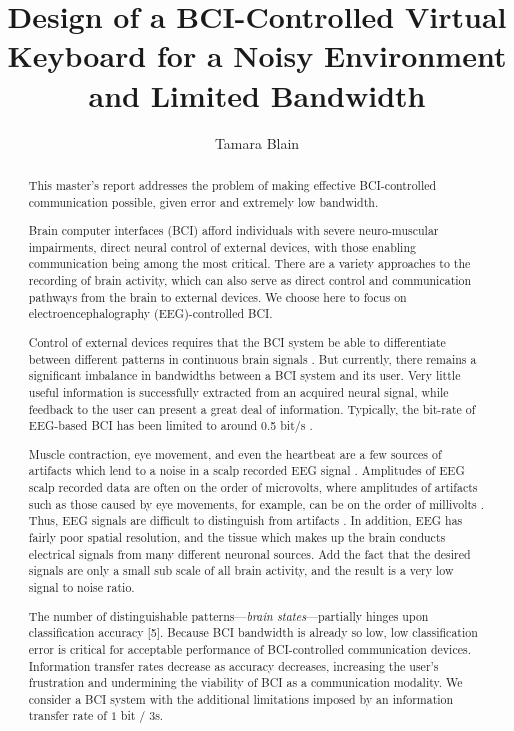 \documentclass[12pt,titlepage]{article}
\begin{document}
\title{Design of a BCI-Controlled Virtual Keyboard for a Noisy Environment and Limited Bandwidth} %
\author{Tamara Blain}
\maketitle

\begin{abstract}
This master's report addresses the problem of making effective BCI-controlled communication possible, given error and extremely low bandwidth.

Brain computer interfaces (BCI) afford individuals with severe neuro-muscular impairments, direct neural control of external devices, with those enabling communication being among the most critical.  There are a variety approaches to the recording of brain activity, which can also serve as direct control and communication pathways from the brain to external devices.  We choose here to focus on electroencephalography (EEG)-controlled BCI.

Control of external devices requires that the BCI system be able to differentiate between different patterns in continuous brain signals \cite{lotte_review_2007}.  But currently, there remains a significant imbalance in bandwidths between a BCI system and its user.  Very little useful information is successfully extracted from an acquired neural signal, while feedback to the user can present a 
great deal of information.  Typically, the bit-rate of EEG-based BCI has been limited to around 0.5 bit/s \cite{millan2004}.

Muscle contraction, eye movement, and even the heartbeat are a few sources of artifacts which lend to a noise in a scalp recorded EEG signal \cite{nunez_electric_2005}.  Amplitudes of EEG scalp recorded data are often on the order of microvolts, where amplitudes of artifacts such as those caused by eye movements, for example, can be on the order of millivolts \cite{tatum2007handbook}.  Thus, EEG signals are difficult to distinguish from artifacts \cite{nunez_electric_2005}.  In addition, EEG has fairly poor spatial resolution, and the tissue which makes up the brain conducts electrical signals from many 
different neuronal sources.  Add the fact that the desired signals are only a small sub scale of all 
brain activity, and the result is a very low signal to noise ratio.

The number of distinguishable patterns---\emph{brain states}---partially hinges upon classification 
accuracy [5].  Because BCI bandwidth is already so low, low classification error is critical for 
acceptable performance of BCI-controlled communication devices.  Information transfer rates 
decrease as accuracy decreases, increasing the user's frustration and  undermining the viability 
of BCI as a communication modality.   We consider a BCI system with the additional 
limitations imposed by an information transfer rate of $1$ bit $/$ $3$s.


\end{abstract}
\end{document}

